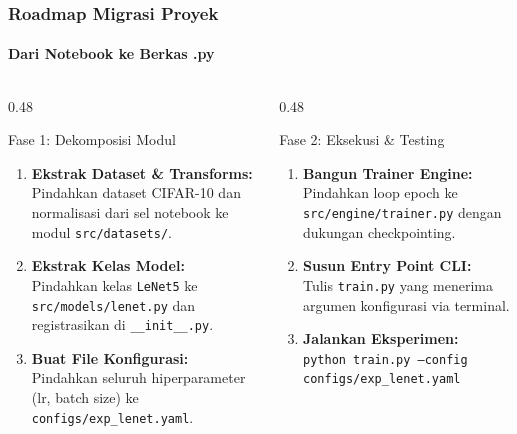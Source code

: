 \documentclass[t,aspectratio=169,xcolor=dvipsnames]{beamer}
\begin{document}
\begin{frame}
  \frametitle{Roadmap Migrasi Proyek}
  \framesubtitle{Dari Notebook ke Berkas .py}

  \begin{columns}[t]
    \begin{column}{0.48\textwidth}
      \begin{block}{Fase 1: Dekomposisi Modul}
        \footnotesize
        \begin{enumerate}\setlength{\itemsep}{2pt}
          \item \textbf{Ekstrak Dataset \& Transforms:}\\
            Pindahkan dataset CIFAR-10 dan normalisasi dari sel notebook ke modul \texttt{src/datasets/}.
          \item \textbf{Ekstrak Kelas Model:}\\
            Pindahkan kelas \texttt{LeNet5} ke \texttt{src/models/lenet.py} dan registrasikan di \texttt{\_\_init\_\_.py}.
          \item \textbf{Buat File Konfigurasi:}\\
            Pindahkan seluruh hiperparameter (lr, batch size) ke \texttt{configs/exp\_lenet.yaml}.
        \end{enumerate}
      \end{block}
    \end{column}

    \begin{column}{0.48\textwidth}
      \begin{block}{Fase 2: Eksekusi \& Testing}
        \footnotesize
        \begin{enumerate}\setlength{\itemsep}{2pt}
          \setcounter{enumi}{3}
          \item \textbf{Bangun Trainer Engine:}\\
            Pindahkan loop epoch ke \texttt{src/engine/trainer.py} dengan dukungan checkpointing.
          \item \textbf{Susun Entry Point CLI:}\\
            Tulis \texttt{train.py} yang menerima argumen konfigurasi via terminal.
          \item \textbf{Jalankan Eksperimen:}\\
            \texttt{python train.py --config configs/exp\_lenet.yaml}
        \end{enumerate}
      \end{block}
    \end{column}
  \end{columns}
\end{frame}
\end{document}
